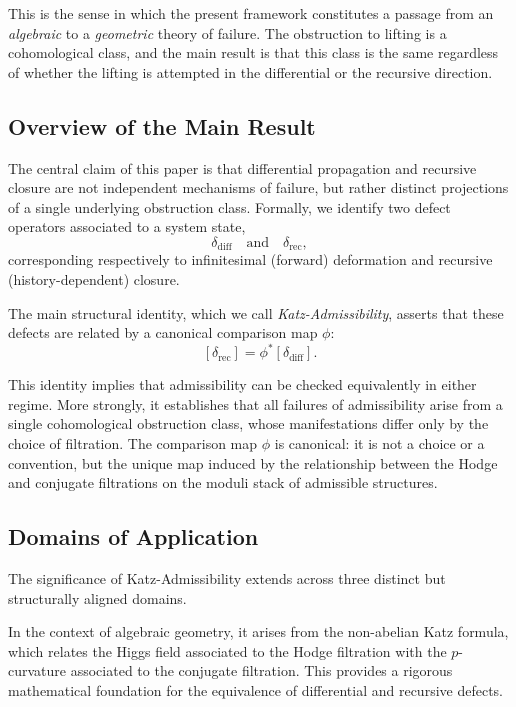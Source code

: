 \documentclass[12pt]{article}
\begin{document}
This is the sense in which the present framework constitutes a passage from an
\emph{algebraic} to a \emph{geometric} theory of failure. The obstruction to lifting
is a cohomological class, and the main result is that this class is the same regardless
of whether the lifting is attempted in the differential or the recursive direction.

\subsection{Overview of the Main Result}

The central claim of this paper is that differential propagation and recursive closure
are not independent mechanisms of failure, but rather distinct projections of a single
underlying obstruction class. Formally, we identify two defect operators associated to
a system state,
\[
\delta_{\mathrm{diff}} \quad \text{and} \quad \delta_{\mathrm{rec}},
\]
corresponding respectively to infinitesimal (forward) deformation and recursive
(history-dependent) closure.

The main structural identity, which we call \emph{Katz-Admissibility}, asserts that
these defects are related by a canonical comparison map $\phi$:
\[
[\delta_{\mathrm{rec}}] = \phi^*[\delta_{\mathrm{diff}}].
\]

This identity implies that admissibility can be checked equivalently in either regime.
More strongly, it establishes that all failures of admissibility arise from a single
cohomological obstruction class, whose manifestations differ only by the choice of
filtration. The comparison map $\phi$ is canonical: it is not a choice or a
convention, but the unique map induced by the relationship between the Hodge and
conjugate filtrations on the moduli stack of admissible structures.

\subsection{Domains of Application}

The significance of Katz-Admissibility extends across three distinct but structurally
aligned domains.

In the context of algebraic geometry, it arises from the non-abelian Katz formula,
which relates the Higgs field associated to the Hodge filtration with the $p$-curvature
associated to the conjugate filtration. This provides a rigorous mathematical
foundation for the equivalence of differential and recursive defects.
\end{document}
